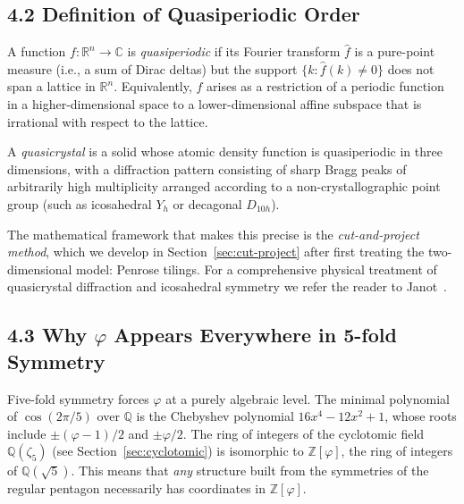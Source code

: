 \subsection{4.2 Definition of Quasiperiodic
Order}\label{sec:quasiperiodic-order}

\begin{definition}
A function \(f: \mathbb{R}^n \to \mathbb{C}\) is
\emph{quasiperiodic} if its Fourier transform
\(\hat{f}\) is a pure-point measure (i.e., a sum
of Dirac deltas) but the support
\(\{k : \hat{f}(k) \neq 0\}\) does not span a
lattice in \(\mathbb{R}^n\). Equivalently, \(f\)
arises as a restriction of a periodic function
in a higher-dimensional space to a
lower-dimensional affine subspace that is
irrational with respect to the lattice.
\end{definition}

\begin{definition}
A \emph{quasicrystal} is a solid whose atomic
density function is quasiperiodic in three
dimensions, with a diffraction pattern consisting
of sharp Bragg peaks of arbitrarily high
multiplicity arranged according to a
non-crystallographic point group (such as
icosahedral \(Y_h\) or decagonal \(D_{10h}\)).
\end{definition}

The mathematical framework that makes this
precise is the \emph{cut-and-project method},
which we develop in Section~\ref{sec:cut-project}
after first treating the two-dimensional model:
Penrose tilings. For a comprehensive physical
treatment of quasicrystal diffraction and
icosahedral symmetry we refer the reader to
Janot~\cite{janot_quasicrystals}.

\subsection{4.3 Why \texorpdfstring{$\varphi$}{phi}
Appears Everywhere in 5-fold
Symmetry}\label{sec:phi-fivefold}

Five-fold symmetry forces \(\varphi\) at a purely
algebraic level. The minimal polynomial of
\(\cos(2\pi/5)\) over \(\mathbb{Q}\) is the
Chebyshev polynomial \(16x^4 - 12x^2 + 1\), whose
roots include \(\pm(\varphi - 1)/2\) and
\(\pm\varphi/2\). The ring of integers of the
cyclotomic field \(\mathbb{Q}(\zeta_5)\) (see
Section~\ref{sec:cyclotomic}) is isomorphic to
\(\mathbb{Z}[\varphi]\), the ring of integers of
\(\mathbb{Q}(\sqrt{5})\). This means that
\emph{any} structure built from the symmetries of
the regular pentagon necessarily has coordinates
in \(\mathbb{Z}[\varphi]\).

